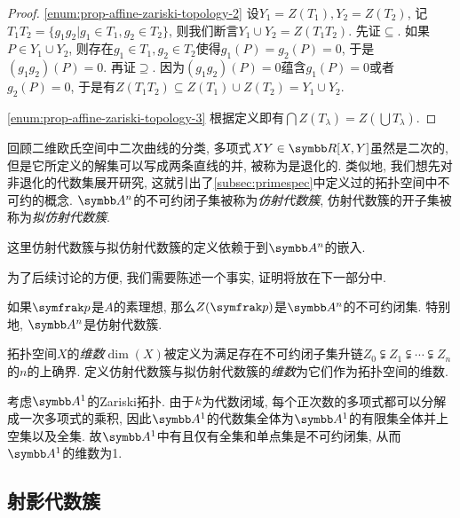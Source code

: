 \begin{proof}
    \ref{enum:prop-affine-zariski-topology-2} 设$Y_1=Z(T_1), Y_2 = Z(T_2)$, 记$T_1T_2=\{g_1g_2\vert g_1\in T_1, g_2\in T_2\}$, 则我们断言$Y_1\cup Y_2 = Z(T_1T_2)$. 先证$\subseteq$. 如果$P\in Y_1\cup Y_2$, 则存在$g_1\in T_1, g_2\in T_2$使得$g_1(P)=g_2(P)=0$, 于是$(g_1g_2)(P)=0$. 再证$\supseteq$. 因为$(g_1g_2)(P)=0$蕴含$g_1(P)=0$或者$g_2(P)=0$, 于是有$Z(T_1T_2)\subseteq Z(T_1)\cup Z(T_2)=Y_1\cup Y_2$.

    \ref{enum:prop-affine-zariski-topology-3} 根据定义即有$\bigcap Z(T_\lambda)=Z(\bigcup T_\lambda)$.
\end{proof}

回顾二维欧氏空间中二次曲线的分类, 多项式$XY\in \RR[X, Y]$虽然是二次的, 但是它所定义的解集可以写成两条直线的并, 被称为是退化的. 类似地, 我们想先对非退化的代数集展开研究, 这就引出了\ref{subsec:primespec}中定义过的拓扑空间中不可约的概念. $\AF^n$的不可约闭子集被称为\emph{仿射代数簇}, 仿射代数簇的开子集被称为\emph{拟仿射代数簇}.

\begin{remark}
    这里仿射代数簇与拟仿射代数簇的定义依赖于到$\AF^n$的嵌入.%
\end{remark}

为了后续讨论的方便, 我们需要陈述一个事实, 证明将放在下一部分中.

\begin{proposition}\label{prop:affineprimeirreducible}
    如果$\ideal{p}$是$A$的素理想, 那么$Z(\ideal{p})$是$\AF^n$的不可约闭集. 特别地, $\AF^n$是仿射代数簇.
\end{proposition}

拓扑空间$X$的\emph{维数}$\dim (X)$被定义为满足存在不可约闭子集升链$Z_0\subsetneqq Z_1\subsetneqq \dotsb \subsetneqq Z_n$的$n$的上确界. 定义仿射代数簇与拟仿射代数簇的\emph{维数}为它们作为拓扑空间的维数.

\begin{example}
    考虑$\AF^1$的Zariski拓扑. 由于$k$为代数闭域, 每个正次数的多项式都可以分解成一次多项式的乘积, 因此$\AF^1$的代数集全体为$\AF^1$的有限集全体并上空集以及全集. 故$\AF^1$中有且仅有全集和单点集是不可约闭集, 从而$\AF^1$的维数为1.
\end{example}

\subsection{射影代数簇}

